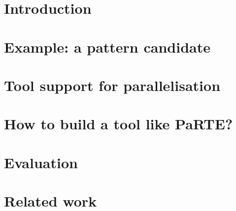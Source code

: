 \documentclass[sigconf]{acmart}
\begin{document}




\maketitle

\section{Introduction}


\section{Example: a pattern candidate}



%


\section{Tool support for parallelisation}



\section{How to build a tool like PaRTE?}



\section{Evaluation}


\section{Related work}

\end{document}
